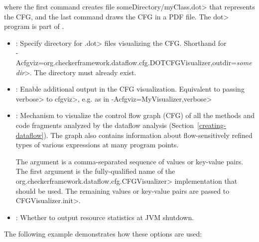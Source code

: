 \noindent
where the first command creates file \<someDirectory/myClass.dot> that
represents the CFG, and the last command draws the CFG in a PDF file.
The \<dot> program is part of .


\begin{itemize}

\item {}:
  Specify directory for \<.dot> files visualizing the CFG\@.
  Shorthand for\\
  \<-Acfgviz=org.checkerframework.dataflow.cfg.DOTCFGVisualizer,outdir=\emph{somedir}>.
  The directory must already exist.

\item {}:
  Enable additional output in the CFG visualization.
  Equivalent to passing \<verbose> to \<cfgviz>, e.g. as in
  \<-Acfgviz=MyVisualizer,verbose>

\item {}:
  Mechanism to visualize the control flow graph (CFG) of
  all the methods and code fragments
  analyzed by the dataflow analysis (Section~\ref{creating-dataflow}).
  The graph also contains information about flow-sensitively refined
  types of various expressions at many program points.

  The argument is a comma-separated sequence of values or key-value pairs.
  The first argument is the fully-qualified name of the
  \<org.checkerframework.dataflow.cfg.CFGVisualizer> implementation
  that should be used. The remaining values or key-value pairs are
  passed to \<CFGVisualizer.init>.

\end{itemize}



\begin{itemize}

\item {}:
  Whether to output resource statistics at JVM shutdown.

\end{itemize}



The following example demonstrates how these options are used:

